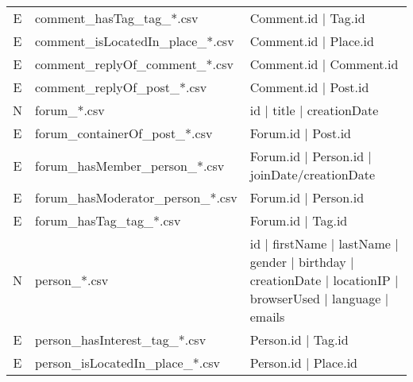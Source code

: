 \begin{table}[htb]
\begin{tabular}{|c|p{4.6cm}|p{11.4cm}|}
        E                       & comment\_hasTag\_tag\_*.csv             & Comment.id | Tag.id                                                                                         \\ 
        E                       & comment\_isLocatedIn\_place\_*.csv      & Comment.id | Place.id                                                                                       \\ 
        E                       & comment\_replyOf\_comment\_*.csv        & Comment.id | Comment.id                                                                                     \\ 
        E                       & comment\_replyOf\_post\_*.csv           & Comment.id | Post.id                                                                                        \\
		\hline
        N                       & forum\_*.csv                            & id | title | creationDate                                                                                   \\
        E                       & forum\_containerOf\_post\_*.csv         & Forum.id | Post.id                                                                                          \\
        E                       & forum\_hasMember\_person\_*.csv         & Forum.id | Person.id | joinDate/creationDate                                                                \\
        E                       & forum\_hasModerator\_person\_*.csv      & Forum.id | Person.id                                                                                        \\
        E                       & forum\_hasTag\_tag\_*.csv               & Forum.id | Tag.id                                                                                           \\
		\hline
        N                       & person\_*.csv                           & id | firstName | lastName | gender | birthday | creationDate | locationIP | browserUsed | language | emails \\
        E                       & person\_hasInterest\_tag\_*.csv         & Person.id | Tag.id                                                                                          \\
        E                       & person\_isLocatedIn\_place\_*.csv       & Person.id | Place.id                                                                                        \\

\end{tabular}
\end{table}
